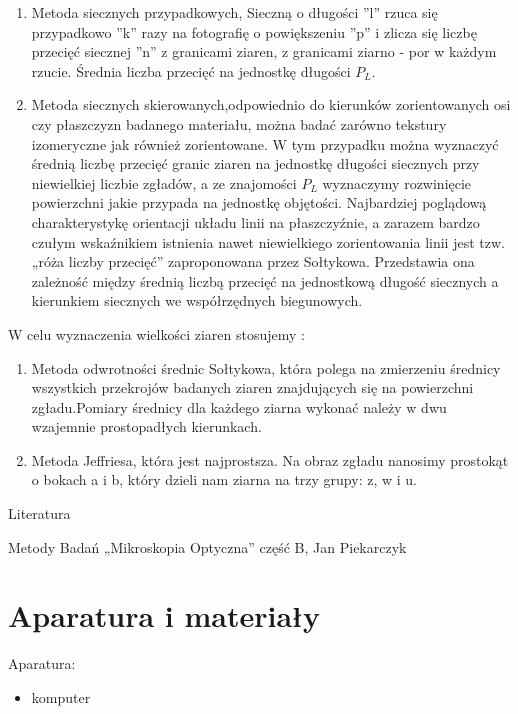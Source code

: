 \documentclass[a4paper,12pt]{article}
\begin{document}
\begin{enumerate}
    \item  Metoda siecznych przypadkowych, Sieczną o długości ”l” rzuca się przypadkowo ”k” razy na fotografię o powiększeniu ”p” i zlicza się liczbę przecięć siecznej ”n” z granicami ziaren, z granicami ziarno - por w każdym rzucie. Średnia liczba przecięć na jednostkę długości $P_L$.
    \item  Metoda siecznych skierowanych,odpowiednio do kierunków zorientowanych osi czy płaszczyzn badanego materiału, można badać zarówno tekstury izomeryczne jak również zorientowane. W tym przypadku można wyznaczyć średnią liczbę przecięć granic ziaren na jednostkę długości siecznych przy niewielkiej liczbie zgładów, a ze znajomości $P_L$ wyznaczymy rozwinięcie powierzchni jakie przypada na jednostkę objętości. Najbardziej poglądową charakterystykę orientacji układu linii na płaszczyźnie, a zarazem bardzo czułym wskaźnikiem istnienia nawet niewielkiego zorientowania linii jest tzw. „róża liczby przecięć” zaproponowana przez Sołtykowa. Przedstawia ona zależność między średnią liczbą przecięć na jednostkową długość siecznych a kierunkiem siecznych we współrzędnych biegunowych.
\end{enumerate}

W celu wyznaczenia wielkości ziaren  stosujemy :

\begin{enumerate}
    \item Metoda odwrotności średnic Sołtykowa, która polega na zmierzeniu średnicy wszystkich przekrojów badanych ziaren znajdujących się na powierzchni zgładu.Pomiary średnicy dla każdego ziarna wykonać należy  w dwu wzajemnie prostopadłych kierunkach.
    \item Metoda Jeffriesa, która jest najprostsza. Na obraz zgładu nanosimy prostokąt o bokach a i b, który dzieli nam ziarna na trzy grupy: z, w i u.
\end{enumerate}


Literatura

Metody Badań „Mikroskopia Optyczna” część B, Jan Piekarczyk

\newpage

\section{Aparatura i materiały}

Aparatura:
\begin{itemize}
    \item komputer
\end{itemize}
\end{document}
